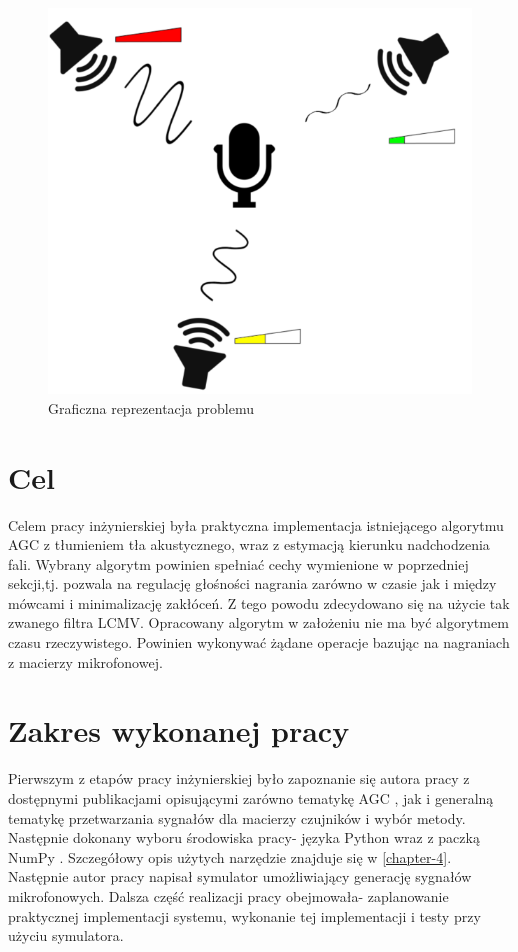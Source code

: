 \begin{figure}[h]
    \centering
    \includegraphics[width=\textwidth]{Images/setup.png}
    \caption{Graficzna reprezentacja problemu}
    \label{fig:setup}
\end{figure}

\section{Cel}
Celem pracy inżynierskiej była praktyczna implementacja istniejącego algorytmu AGC z tłumieniem tła akustycznego, wraz z estymacją kierunku nadchodzenia fali. Wybrany algorytm powinien spełniać cechy wymienione w poprzedniej sekcji,tj. pozwala na regulację głośności nagrania zarówno w czasie jak i między mówcami i minimalizację zakłóceń. Z tego powodu zdecydowano się na użycie tak zwanego filtra LCMV. Opracowany algorytm w założeniu nie ma być algorytmem czasu rzeczywistego. Powinien wykonywać żądane operacje bazując na nagraniach z macierzy mikrofonowej.

\section{Zakres wykonanej pracy}
Pierwszym z etapów pracy inżynierskiej było zapoznanie się autora pracy z dostępnymi publikacjami opisującymi zarówno tematykę AGC \cite{Thiergart2013}, \cite{Archibald2008} jak i generalną tematykę przetwarzania sygnałów dla macierzy czujników \cite{Benesty2008} i wybór metody. 
Następnie dokonany wyboru środowiska pracy- języka Python wraz z paczką NumPy \cite{numpy}. Szczegółowy opis użytych narzędzie znajduje się w \ref{chapter-4}. Następnie autor pracy napisał symulator umożliwiający generację sygnałów mikrofonowych. Dalsza część realizacji pracy obejmowała- zaplanowanie praktycznej implementacji systemu, wykonanie tej implementacji i testy przy użyciu symulatora. 

